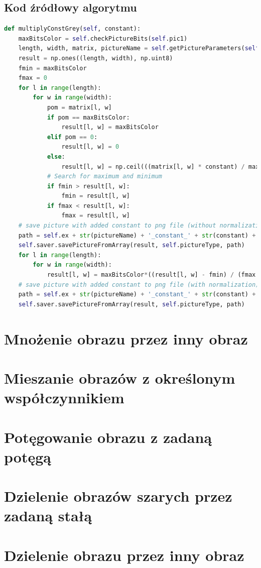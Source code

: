 \documentclass[a4paper,12pt, titlepage]{report}
\begin{document}
\subsection*{Kod źródłowy algorytmu}
\begin{lstlisting}[language=Python]
def multiplyConstGrey(self, constant):
    maxBitsColor = self.checkPictureBits(self.pic1)
    length, width, matrix, pictureName = self.getPictureParameters(self.pic1)
    result = np.ones((length, width), np.uint8)
    fmin = maxBitsColor
    fmax = 0
    for l in range(length):
        for w in range(width):
            pom = matrix[l, w]
            if pom == maxBitsColor:
                result[l, w] = maxBitsColor
            elif pom == 0:
                result[l, w] = 0
            else:
                result[l, w] = np.ceil(((matrix[l, w] * constant) / maxBitsColor))
            # Search for maximum and minimum
            if fmin > result[l, w]:
                fmin = result[l, w]
            if fmax < result[l, w]:
                fmax = result[l, w]
    # save picture with added constant to png file (without normalization)
    path = self.ex + str(pictureName) + '_constant_' + str(constant) + '.png'
    self.saver.savePictureFromArray(result, self.pictureType, path)
    for l in range(length):
        for w in range(width):
            result[l, w] = maxBitsColor*((result[l, w] - fmin) / (fmax - fmin))
    # save picture with added constant to png file (with normalization)
    path = self.ex + str(pictureName) + '_constant_' + str(constant) + '_normalized.png'
    self.saver.savePictureFromArray(result, self.pictureType, path)
\end{lstlisting}
\section{Mnożenie obrazu przez inny obraz}
\section{Mieszanie obrazów z określonym współczynnikiem}
\section{Potęgowanie obrazu z zadaną potęgą}
\section{Dzielenie obrazów szarych przez zadaną stałą}
\section{Dzielenie obrazu przez inny obraz}
\end{document}
